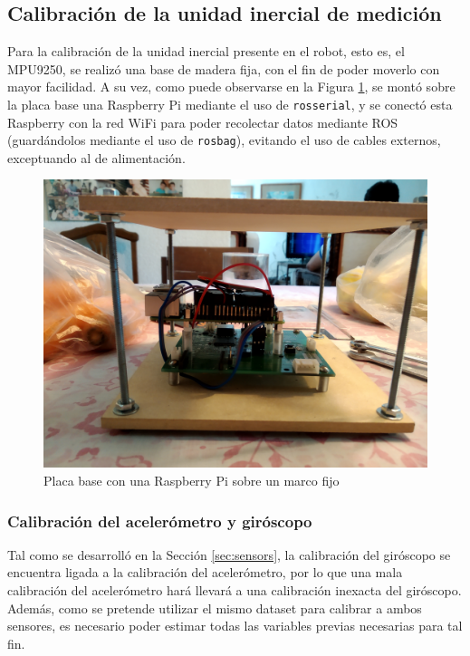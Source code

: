 \subsection{Calibración de la unidad inercial de medición}
Para la calibración de la unidad inercial presente en el robot, esto es, el MPU9250, se realizó una base de madera fija, con el fin de poder moverlo con mayor facilidad. A su vez, como puede observarse en la Figura \ref{fig:baseboardimucalibrationwithframe}, se montó sobre la placa base una Raspberry Pi mediante el uso de \texttt{rosserial}, y se conectó esta Raspberry con la red WiFi para poder recolectar datos mediante ROS (guardándolos mediante el uso de \texttt{rosbag}), evitando el uso de cables externos, exceptuando al de alimentación.
\begin{figure}
    \centering
    \includegraphics[width=\textwidth]{Img/BaseBoardIMUCalibrationWithFrame.jpg}
    \caption{Placa base con una Raspberry Pi sobre un marco fijo}
    \label{fig:baseboardimucalibrationwithframe}
\end{figure}


\subsubsection{Calibración del acelerómetro y giróscopo}
Tal como se desarrolló en la Sección \ref{sec:sensors}, la calibración del giróscopo se encuentra ligada a la calibración del acelerómetro, por lo que una mala calibración del acelerómetro hará llevará a una calibración inexacta del giróscopo. Además, como se pretende utilizar el mismo dataset para calibrar a ambos sensores, es necesario poder estimar todas las variables previas necesarias para tal fin.

